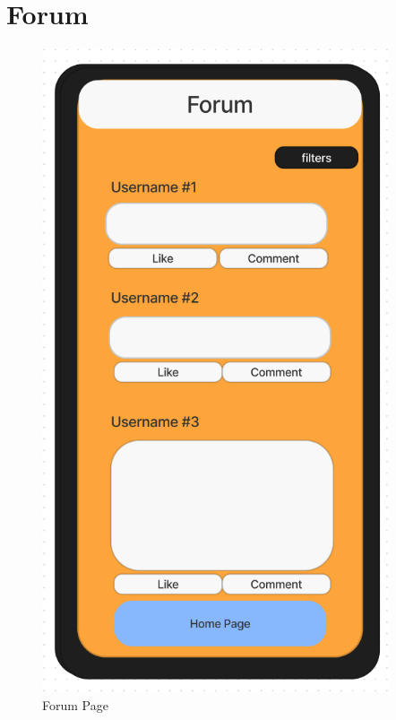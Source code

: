 \documentclass[title page]{article}
\begin{document}
\section{Forum}
\begin{figure}[!h]
    \begin{center}
          \includegraphics[height=19cm]{images/forum.png}
          \caption{Forum Page}
          \label{fig:forum}
    \end{center}
\end{figure}
\end{document}
